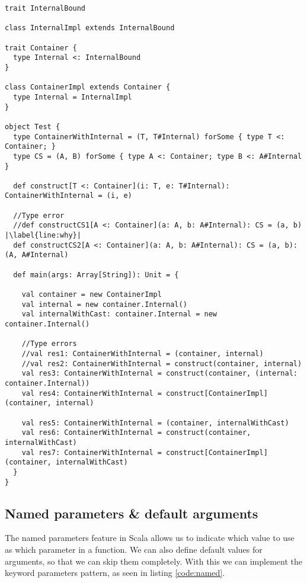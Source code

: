\begin{lstlisting}[caption=Existential inference, label=code:existentials, escapechar=|, float, floatplacement=H]
trait InternalBound

class InternalImpl extends InternalBound

trait Container {
  type Internal <: InternalBound
}

class ContainerImpl extends Container {
  type Internal = InternalImpl
}

object Test {
  type ContainerWithInternal = (T, T#Internal) forSome { type T <: Container; }
  type CS = (A, B) forSome { type A <: Container; type B <: A#Internal }

  def construct[T <: Container](i: T, e: T#Internal): ContainerWithInternal = (i, e)

  //Type error
  //def constructCS1[A <: Container](a: A, b: A#Internal): CS = (a, b) |\label{line:why}|
  def constructCS2[A <: Container](a: A, b: A#Internal): CS = (a, b): (A, A#Internal)

  def main(args: Array[String]): Unit = {

    val container = new ContainerImpl
    val internal = new container.Internal()
    val internalWithCast: container.Internal = new container.Internal()

    //Type errors
    //val res1: ContainerWithInternal = (container, internal)
    //val res2: ContainerWithInternal = construct(container, internal)
    val res3: ContainerWithInternal = construct(container, (internal: container.Internal))
    val res4: ContainerWithInternal = construct[ContainerImpl](container, internal)

    val res5: ContainerWithInternal = (container, internalWithCast)
    val res6: ContainerWithInternal = construct(container, internalWithCast)
    val res7: ContainerWithInternal = construct[ContainerImpl](container, internalWithCast)
  }
}
\end{lstlisting}

\subsection{Named parameters \& default arguments}

The named parameters feature in Scala allows us to indicate which value to use as which parameter in a function. We can also define default values for arguments, so that we can skip them completely. With this we can implement the keyword parameters pattern, as seen in listing \ref{code:named}.

